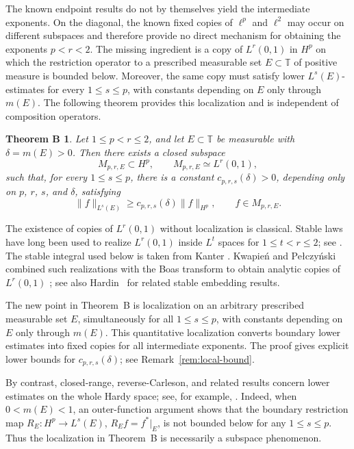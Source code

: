 \documentclass[11pt, reqno]{amsart}
\newtheorem*{theoremB}{Theorem B}
\theoremstyle{definition}
\theoremstyle{remark}
\newcommand{\T}{\mathbb{T}}
\begin{document}
The known endpoint results do not by themselves yield the intermediate
exponents. On the diagonal, the known fixed copies of \(\ell^p\) and
\(\ell^2\) may occur on different subspaces and therefore provide no
direct mechanism for obtaining the exponents \(p<r<2\). The missing
ingredient is a copy of \(L^r(0,1)\) in \(H^p\) on which the
restriction operator to a prescribed measurable set
\(E\subset\T\) of positive measure is bounded below. Moreover, the
same copy must satisfy lower \(L^s(E)\)-estimates for every
\(1\le s\le p\), with constants depending on \(E\) only through
\(m(E)\). The following theorem provides this localization and is
independent of composition operators.

\begin{theoremB}
Let \(1\le p<r\le2\), and let \(E\subset\T\) be measurable with \(\delta=m(E)>0\). Then there exists a closed subspace
\[
        M_{p,r,E}\subset H^p,
        \qquad
        M_{p,r,E}\simeq L^r(0,1),
\]
such that, for every \(1\le s\le p\), there is a constant \(c_{p,r,s}(\delta)>0\), depending only on \(p\), \(r\), \(s\), and \(\delta\), satisfying
\[
        \|f\|_{L^s(E)}
        \ge
        c_{p,r,s}(\delta)\|f\|_{H^p},
        \qquad
        f\in M_{p,r,E}.
\]
\end{theoremB}

The existence of copies of \(L^r(0,1)\) without localization is
classical. Stable laws have long been used to realize \(L^r(0,1)\)
inside \(L^t\) spaces for \(1\le t<r\le2\); see
\cite{BretagnolleDacunhaCastelleKrivine1966}. The stable integral
used below is taken from Kanter
\cite[Sections~4--5 and the theorem, pp.~405--406]{Kanter1973}.
Kwapie\'n and Pe{\l}czy\'nski combined such realizations with the
Boas transform to obtain analytic copies of \(L^r(0,1)\)
\cite[Proposition~2.1 and its proof]{KwapienPelczynski1976};
see also Hardin~\cite{Hardin1982} for related stable embedding
results.

The new point in Theorem~B is localization on an arbitrary prescribed
measurable set \(E\), simultaneously for all \(1\le s\le p\), with
constants depending on \(E\) only through \(m(E)\). This quantitative
localization converts boundary lower estimates into fixed copies for
all intermediate exponents. The proof gives explicit lower bounds for
\(c_{p,r,s}(\delta)\); see Remark~\ref{rem:local-bound}.

By contrast, closed-range, reverse-Carleson, and related results
concern lower estimates on the whole Hardy space; see, for example,
\cite{CimaThomsonWogen1974,Zorboska1994,
LefevreLiQueffelecRodriguezPiazza2012,
HartmannMassanedaNicolauOrtegaCerda2014,
ChalendarPartington2019,Dyakonov2025}.
Indeed, when \(0<m(E)<1\), an outer-function argument shows that the
boundary restriction map
\(R_E:H^p\to L^s(E)\), \(R_Ef=f^*|_E\), is not bounded below for any
\(1\le s\le p\). Thus the localization in Theorem~B is necessarily a
subspace phenomenon.
\end{document}
